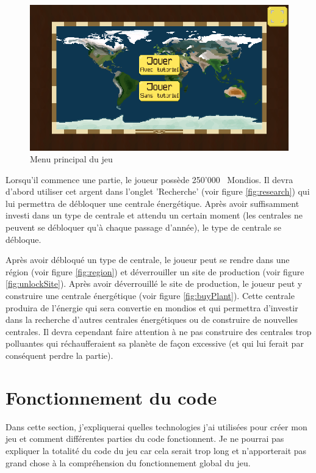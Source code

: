 \documentclass{article}
\newcommand{\initMoney}{250'000}
\begin{document}
        \begin{figure}[H]
                \includegraphics[width=\linewidth]{../images/mainMenu}
                \caption{Menu principal du jeu}
                \label{fig:mainMenu}
        \end{figure}
        
        Lorsqu'il commence une partie, le joueur possède \initMoney ~ Mondios. Il devra d'abord utiliser cet argent dans l'onglet 'Recherche' (voir figure \ref{fig:research}) qui lui permettra de débloquer une centrale énergétique. Après avoir suffisamment investi dans un type de centrale et attendu un certain moment (les centrales ne peuvent se débloquer qu'à chaque passage d'année), le type de centrale se débloque.
        
        
        Après avoir débloqué un type de centrale, le joueur peut se rendre dans une région (voir figure \ref{fig:region}) et déverrouiller un site de production (voir figure \ref{fig:unlockSite}). Après avoir déverrouillé le site de production, le joueur peut y construire une centrale énergétique (voir figure \ref{fig:buyPlant}). Cette centrale produira de l'énergie qui sera convertie en mondios et qui permettra d'investir dans la recherche d'autres centrales énergétiques ou de construire de nouvelles centrales. Il devra cependant faire attention à ne pas construire des centrales trop polluantes qui réchaufferaient sa planète de façon excessive (et qui lui ferait par conséquent perdre la partie).
        

        \section{Fonctionnement du code}
        Dans cette section, j'expliquerai quelles technologies j'ai utilisées pour créer mon jeu et comment différentes parties du code fonctionnent. Je ne pourrai pas expliquer la totalité du code du jeu car cela serait trop long et n'apporterait pas grand chose à la compréhension du fonctionnement global du jeu. 
        
\end{document}
